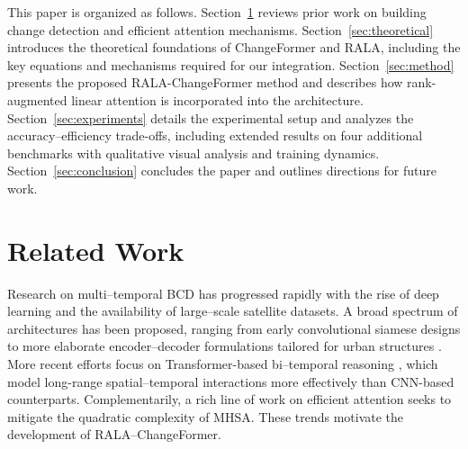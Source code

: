 \documentclass[runningheads]{llncs}
\newcommand{\journal}[1]{{\color{orange}#1}}
\begin{document}
This paper is organized as follows.
Section~\ref{sec:related-work} reviews prior work on building change detection
and efficient attention mechanisms.
Section~\ref{sec:theoretical} introduces the theoretical foundations of
ChangeFormer and RALA, including the key equations and mechanisms required for
our integration.
Section~\ref{sec:method} presents the proposed RALA-ChangeFormer method and
describes how rank-augmented linear attention is incorporated into the
architecture.
Section~\ref{sec:experiments} details the experimental setup and analyzes the
accuracy–efficiency trade-offs\journal{, including extended results on four
additional benchmarks with qualitative visual analysis and training dynamics}.
Section~\ref{sec:conclusion} concludes the paper and outlines directions for
future work.

\section{Related Work}
\label{sec:related-work}

Research on multi–temporal BCD has progressed rapidly with the rise of deep
learning and the availability of large–scale satellite datasets. A broad
spectrum of architectures has been proposed, ranging from early convolutional
siamese designs
\cite{Daudt2018SiamICIP,Yang2021DeepSiamese,Guo2021DBFUpdate,Cao2023FFCTL,Xiao2024CSCLNet}
to more elaborate encoder–decoder formulations tailored for urban structures
\cite{Zhao2023DualEncoderDecoder,Tan2024SCM}. More recent efforts focus on
Transformer-based bi–temporal reasoning
\cite{Fang2021SNUNetCD,Chen2022BIT,Bandara2022ChangeFormer,Zheng2022HFANet,Teng2023SwinCD},
which model long-range spatial–temporal interactions more effectively than
CNN-based counterparts. Complementarily, a rich line of work on efficient
attention
\cite{Katharopoulos2020Linear,Choromanski2021Performer,Wang2020Linformer,Xiong2021Nystromformer,Liu2021Swin,Wei2023Sparsifiner}
seeks to mitigate the quadratic complexity of MHSA. These trends motivate the
development of RALA–ChangeFormer.
\end{document}
